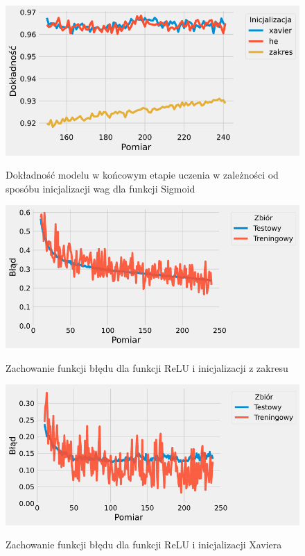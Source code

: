 \documentclass{article}
\begin{document}
\begin{figure}[H]
	\centering
	\caption{Dokładność modelu w końcowym etapie uczenia w zależności od sposóbu inicjalizacji wag dla funkcji Sigmoid}
	\includegraphics[width=\textwidth]{sig_init_acc_zoom.png}
	\label{fig:res207}
\end{figure}
\begin{figure}[H]
	\centering
	\caption{Zachowanie funkcji błędu dla funkcji ReLU i inicjalizacji z zakresu}
	\includegraphics[width=\textwidth]{sig_init_zak.png}
	\label{fig:res208}
\end{figure}
\begin{figure}[H]
	\centering
	\caption{Zachowanie funkcji błędu dla funkcji ReLU i inicjalizacji Xaviera}
	\includegraphics[width=\textwidth]{sig_init_xav.png}
	\label{fig:res209}
\end{figure}
\end{document}
